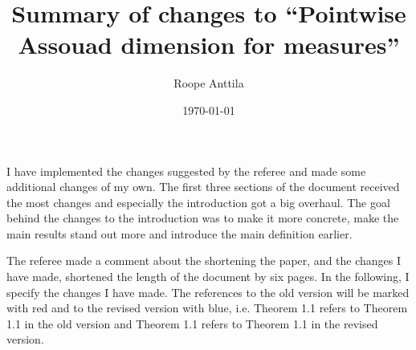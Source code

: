\documentclass[12pt]{amsart}
\numberwithin{equation}{section}
\newcommand{\old}[1]{{\color{red} #1}}
\newcommand{\new}[1]{{\color{blue} #1}}
\theoremstyle{plain}
\theoremstyle{definition}
\theoremstyle{remark}
\begin{document}
\title{Summary of changes to ``Pointwise Assouad dimension for measures''}
\author{Roope Anttila}

\date{\today}

\maketitle

I have implemented the changes suggested by the referee and made some additional changes of my own. The first three sections of the document received the most changes and especially the introduction got a big overhaul. The goal behind the changes to the introduction was to make it more concrete, make the main results stand out more and introduce the main definition earlier.

The referee made a comment about the shortening the paper, and the changes I have made, shortened the length of the document by six pages. In the following, I specify the changes I have made. The references to the old version will be marked with \old{red} and to the revised version with \new{blue}, i.e. \old{Theorem 1.1} refers to Theorem 1.1 in the old version and \new{Theorem 1.1} refers to Theorem 1.1 in the revised version.
\end{document}
